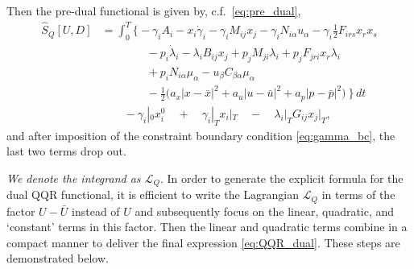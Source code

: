 \documentclass[11pt]{article}
\newcommand{\half}{\frac{1}{2}}
\newcommand{\scl}{\mathcal{L}}
\begin{document}
Then the pre-dual functional is given by, c.f.~\eqref{eq:pre_dual},
\begin{equation*}
    \begin{aligned}
        \widehat{S}_Q[U,D] & =  \int_0^T \Big\{ - \gamma_i A_i - x_i \dot{\gamma}_i - \gamma_i M_{ij} x_j - \gamma_i N_{i \alpha} u_\alpha - \gamma_i \half F_{irs} x_r x_s \\
        & \qquad \qquad - p_i \dot{\lambda}_i - \lambda_i B_{ij} x_j + p_j M_{ji} \lambda_i + p_j F_{jri} x_r \lambda_i\\
        & \qquad \qquad +  p_i N_{i \alpha} \mu_\alpha -  u_\beta C_{\beta \alpha} \mu_\alpha\\
        & \qquad \qquad - \half \Big( a_x |x - \bar{x}|^2 + a_u |u - \bar{u}|^2 + a_p |p - \bar{p}|^2 \Big) \ \Big\} \, dt\\
        & \qquad - \gamma_i|_0 x^0_i \quad + \quad \gamma_i|_T x_i|_T \quad - \quad \lambda_i|_T G_{ij} x_j|_T,
    \end{aligned}
\end{equation*}
and after imposition of the constraint boundary condition \eqref{eq:gamma_bc}, the last two terms drop out. 

\emph{We denote the integrand as $\scl_Q$}. In order to generate the explicit formula for the dual QQR functional, it is efficient to write the Lagrangian $\scl_Q$ in terms of the factor $U - \bar{U}$ instead of $U$ and subsequently focus on the linear, quadratic, and `constant' terms in this factor. Then the linear and quadratic terms combine in a compact manner to deliver the final expression \eqref{eq:QQR_dual}. These steps are demonstrated below.
\end{document}
